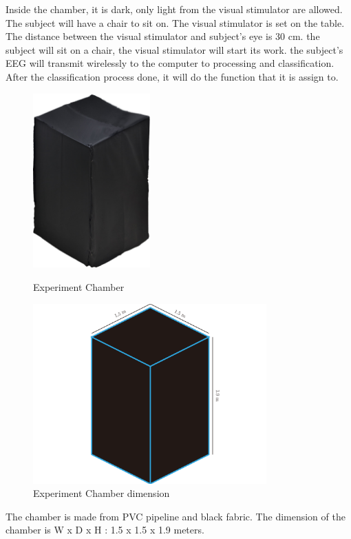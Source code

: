 Inside the chamber, it is dark, only light from the visual stimulator are allowed. The subject will have a chair to sit on. The visual stimulator is set on the table. The distance between the visual stimulator and subject's eye is 30 cm. the subject will sit on a chair, the visual stimulator will start its work. the subject's EEG will transmit wirelessly to the computer to processing and classification. After the classification process done, it will do the function that it is assign to. \newpage
\begin{figure}[H]
	\centering
	\includegraphics[width=0.4\textwidth]{chapter6/blackbox.jpg}
	\caption{Experiment Chamber}
	\vspace{1.5cm}
	\includegraphics[width=0.8\textwidth]{chapter6/dark_wire.pdf}
	\caption{Experiment Chamber dimension}
\end{figure}
\hspace{1.5cm}The chamber is made from PVC pipeline and black fabric. The dimension of the chamber is W x D x H : 1.5 x 1.5 x 1.9 meters.\\


